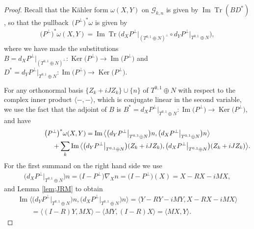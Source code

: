 \documentclass[10pt,a4paper]{amsart}
\DeclareMathOperator{\Tr}{Tr}
\numberwithin{equation}{section}
\newcommand{\cG}{{\mathcal G}}
\begin{document}
\begin{proof}
Recall that the K\"ahler form $\omega(X,Y)$ on $\cG_{k,n}$ is given by $\operatorname{Im} \Tr(BD^*)$, so that the pull\-back~$\big(P^\perp\big)^*\omega$ is given by
\begin{gather*}
\big(P^\perp\big)^*\omega(X,Y)= \operatorname{Im} \Tr \big( d_X P^\perp\big|_{(T^{0,1} \oplus N)^\perp} \circ d_Y P^\perp \big|_{T^{0,1}\oplus N} \big),
\end{gather*}
where we have made the substitutions $B= d_X P^\perp\big|_{(T^{0,1}\oplus N)^\perp}\colon \operatorname{Ker}\big(P^\perp\big) \to \operatorname{Im}\big(P^\perp\big)$ and $D^* = d_Y P^\perp\big|_{T^{0,1} \oplus N} \colon \operatorname{Im}\big(P^\perp\big) \to \operatorname{Ker}\big(P^\perp\big)$.

For any orthonormal basis $\{Z_k + i J Z_k\} \cup \{n\}$ of $T^{0,1} \oplus N$ with respect to the complex inner product $\langle - ,- \rangle$, which is conjugate linear in the second variable, we use the fact that the adjoint of $B$ is $B^* = d_X P^\perp\big|_{T^{0,1} \oplus N} \colon \operatorname{Im}\big(P^\perp\big) \to \operatorname{Ker}\big(P^\perp\big)$, and have
\begin{gather*}
\big(P^\perp\big)^*\omega(X,Y) = \operatorname{Im} \big\langle \big( d_Y P^\perp\big|_{T^{0,1}\oplus N} \big) n, \big( d_X P^\perp\big|_{T^{0,1} \oplus N} \big) n \big\rangle\\
\hphantom{\big(P^\perp\big)^*\omega(X,Y) =}{} + \sum _k \operatorname{Im} \big\langle \big( d_Y P^\perp\big|_{T^{0,1} \oplus N} \big) (Z_k + i J Z_k), \big( d_X P^\perp\big|_{T^{0,1}\oplus N} \big) (Z_k + i J Z_k) \big\rangle.
\end{gather*}
For the first summand on the right hand side we use
\begin{gather*}
\big( d_X P^\perp\big|_{T^{0,1} \oplus N } \big) n = \big(I-P^\perp\big) \nabla_X n = \big(I-P^\perp\big)(X) = X - RX - iMX,
\end{gather*}
and Lemma \ref{lem;JRM} to obtain
\begin{gather*}
\operatorname{Im} \big\langle \big( d_Y P^\perp\big|_{T^{0,1}\oplus N} \big) n, \big( d_X P^\perp\big|_{T^{0,1}\oplus N} \big) n \big\rangle
 = \langle Y - RY - iMY, X - RX - iMX \rangle \\
 \qquad{} = \langle (I-R)Y ,MX \rangle - \langle MY, (I-R)X\rangle = \langle MX, Y \rangle.
\end{gather*}


\end{proof}
\end{document}
